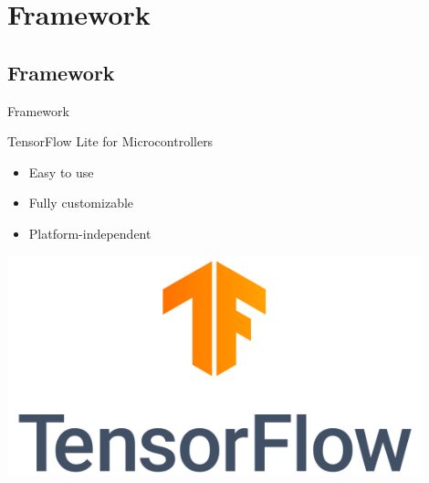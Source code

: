 \documentclass{beamer}
\begin{document}
\section{Framework}
\subsection{Framework}
\begin{frame}{Framework}

TensorFlow Lite for Microcontrollers
\begin{minipage}{0.5\textwidth}
	\begin{itemize}
		\item<2->Easy to use
		\item<3->Fully customizable
		\item<4->Platform-independent
	\end{itemize}
	\end{minipage}
	\begin{minipage}{0.48\textwidth}
		\includegraphics[width=0.9\textwidth]{figures/tensorflow.png}
	\end{minipage}

\end{frame}
\end{document}
